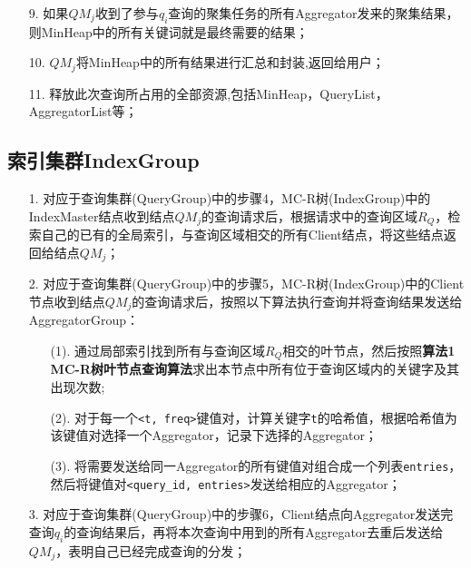 \documentclass{elegantpaper}
\begin{document}
\begin{itemize}
\begin{algorithm}
\begin{algorithmic}[1]
                \end{algorithmic}
                  
              \end{algorithm} 
    \item[9.] 如果$QM_j$收到了参与$q_i$查询的聚集任务的所有Aggregator发来的聚集结果，则MinHeap中的所有关键词就是最终需要的结果；
    \item[10.] $QM_j$将MinHeap中的所有结果进行汇总和封装,返回给用户；
    \item[11.] 释放此次查询所占用的全部资源,包括MinHeap，QueryList，AggregatorList等；
\end{itemize}
\subsection{索引集群IndexGroup}
\begin{itemize}
    \item[1.] 对应于查询集群(QueryGroup)中的步骤4，MC-R树(IndexGroup)中的IndexMaster结点收到结点$QM_j$的查询请求后，根据请求中的查询区域$R_Q$，检索自己的已有的全局索引，与查询区域相交的所有Client结点，将这些结点返回给结点$QM_j$；
    \item[2.] 对应于查询集群(QueryGroup)中的步骤5，MC-R树(IndexGroup)中的Client节点收到结点$QM_j$的查询请求后，按照以下算法执行查询并将查询结果发送给AggregatorGroup：
              \begin{itemize}

                \item[(1).] 通过局部索引找到所有与查询区域$R_Q$相交的叶节点，然后按照{\bfseries 算法1 MC-R树叶节点查询算法}求出本节点中所有位于查询区域内的关键字及其出现次数;
                
                \item[(2).] 对于每一个\verb|<t, freq>|键值对，计算关键字\verb|t|的哈希值，根据哈希值为该键值对选择一个Aggregator，记录下选择的Aggregator；
                
                \item[(3).] 将需要发送给同一Aggregator的所有键值对组合成一个列表\verb|entries|，然后将键值对\verb|<query_id, entries>|发送给相应的Aggregator；
                  
              \end{itemize}
    \item[3.] 对应于查询集群(QueryGroup)中的步骤6，Client结点向Aggregator发送完查询$q_i$的查询结果后，再将本次查询中用到的所有Aggregator去重后发送给$QM_j$，表明自己已经完成查询的分发；
\end{itemize}
\end{document}
